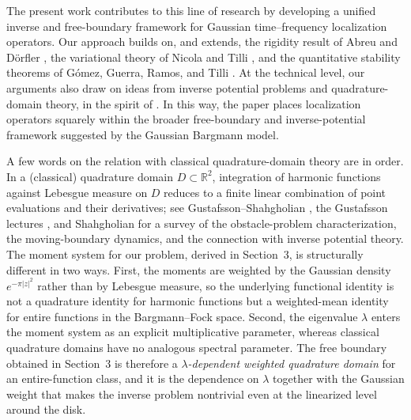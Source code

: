 \documentclass[a4paper,11pt,reqno]{amsart}
\numberwithin{equation}{section}
\theoremstyle{plain} %
\theoremstyle{definition} %
\theoremstyle{remark}
\newcommand{\R}{\mathbb{R}}
\begin{document}
The present work contributes to this line of research by developing a unified inverse and free-boundary framework for Gaussian time--frequency localization operators. Our approach builds on, and extends, the rigidity result of Abreu and D\"orfler \cite{Abreu-Doerfler}, the variational theory of Nicola and Tilli \cite{Nicola-Tilli,Nicola-Tilli-2}, and the quantitative stability theorems of G\'omez, Guerra, Ramos, and Tilli \cite{Gomez-Guerra-Ramos-Tilli}. At the technical level, our arguments also draw on ideas from inverse potential problems and quadrature-domain theory, in the spirit of \cite{Isakov,Cherednichenko,Gustafsson,Gustafsson-Shahgholian,Shahgholian}. In this way, the paper places localization operators squarely within the broader free-boundary and inverse-potential framework suggested by the Gaussian Bargmann model.

A few words on the relation with classical quadrature-domain theory are in order. In a (classical) quadrature domain $D\subset \R^2$, integration of harmonic functions against Lebesgue measure on $D$ reduces to a finite linear combination of point evaluations and their derivatives; see Gustafsson--Shahgholian \cite{Gustafsson-Shahgholian}, the Gustafsson lectures \cite{Gustafsson}, and Shahgholian \cite{Shahgholian} for a survey of the obstacle-problem characterization, the moving-boundary dynamics, and the connection with inverse potential theory. The moment system for our problem, derived in Section~3, is structurally different in two ways. First, the moments are weighted by the Gaussian density $e^{-\pi|z|^2}$ rather than by Lebesgue measure, so the underlying functional identity is not a quadrature identity for harmonic functions but a weighted-mean identity for entire functions in the Bargmann--Fock space. Second, the eigenvalue $\lambda$ enters the moment system as an explicit multiplicative parameter, whereas classical quadrature domains have no analogous spectral parameter. The free boundary obtained in Section~3 is therefore a \emph{$\lambda$-dependent weighted quadrature domain} for an entire-function class, and it is the dependence on $\lambda$ together with the Gaussian weight that makes the inverse problem nontrivial even at the linearized level around the disk.
\end{document}
